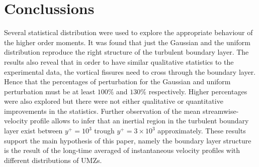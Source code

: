 \documentclass[aps,reprint,amsmath,amssymb,pra,floatfix]{revtex4-1}%
\begin{document}
\section{Conclussions}
Several statistical distribution were used to explore the appropriate behaviour of the higher order moments. It was found that just the Gaussian and the uniform distribution reproduce the right structure of the turbulent boundary layer. The results also reveal that in order to have similar qualitative statistics to the experimental data, the vortical fissures need to cross through the boundary layer. Hence that the percentages of perturbation for the Gaussian and uniform perturbation must be at least $100\%$ and $130\%$ respectively. Higher percentages were also explored but there were not either qualitative or quantitative improvements in the statistics. Further observation of the mean streamwise-velocity profile allows to infer that an inertial region in the turbulent boundary layer exist between $y^+=10^3$ trough $y^+=3\times 10^3$ approximately.  These results support the main hypothesis of this paper, namely the boundary layer structure is the result of the long-time averaged of instantaneous velocity profiles with different distributions of UMZs. 

\end{document}
